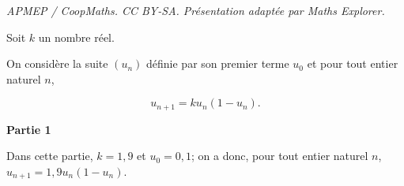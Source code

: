 \documentclass[10pt]{article}
\begin{document}
\noindent\textit{APMEP / CoopMaths. CC BY-SA. Présentation adaptée par Maths Explorer.}\par\medskip
\medskip

Soit $k$ un nombre réel.

On considère la suite $\left(u_n\right)$ définie par son premier terme $u_0$ et pour tout entier naturel $n$,

\[u_{n+1} = ku_n\left(1- u_n\right).\]





\bigskip

\textbf{Partie 1}

\medskip

Dans cette partie, $k = 1,9$ et $u_0 = 0,1$; on a donc,  pour tout entier naturel $n$,\: $u_{n+1} = 1,9u_n\left(1 - u_n\right)$.
\end{document}
